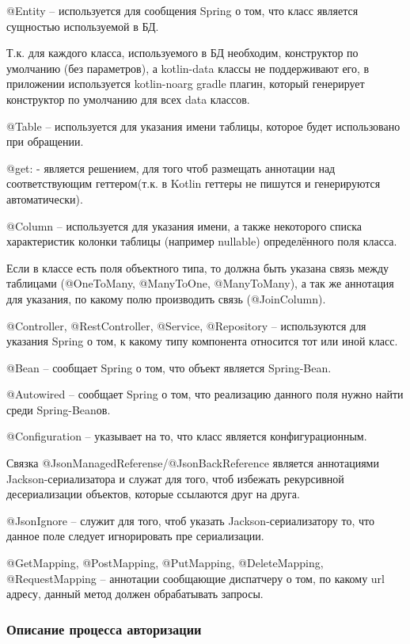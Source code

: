 @Entity – используется для сообщения Spring о том, что класс является сущностью используемой в БД.

Т.к. для каждого класса, используемого в БД необходим, конструктор по умолчанию (без параметров), а kotlin-data классы не поддерживают его, в приложении используется kotlin-noarg gradle плагин, который генерирует конструктор по умолчанию для всех data классов.

@Table – используется для указания имени таблицы, которое будет использовано при обращении.

@get: - является решением, для того чтоб размещать аннотации над соответствующим геттером(т.к. в Kotlin геттеры не пишутся и генерируются автоматически).

@Column – используется для указания имени, а также некоторого списка характеристик колонки таблицы (например nullable) определённого поля класса.

Если в классе есть поля объектного типа, то должна быть указана связь между таблицами (@OneToMany, @ManyToOne, @ManyToMany), а так же аннотация для указания, по какому полю производить связь (@JoinColumn).

@Controller, @RestController, @Service, @Repository – используются для указания Spring о том, к какому типу компонента относится тот или иной класс.

@Bean – сообщает Spring о том, что объект является Spring-Bean.

@Autowired – сообщает Spring о том, что реализацию данного поля нужно найти среди Spring-Beanов.

@Configuration – указывает на то, что класс является конфигурационным.

Связка @JsonManagedReferense/@JsonBackReference является аннотациями Jackson-сериализатора и служат для того, чтоб избежать рекурсивной десериализации объектов, которые ссылаются друг на друга.

@JsonIgnore – служит для того, чтоб указать Jackson-сериализатору то, что данное поле следует игнорировать пре сериализации.

@GetMapping, @PostMapping, @PutMapping, @DeleteMapping, @RequestMapping – аннотации сообщающие диспатчеру о том, по какому url адресу, данный метод должен обрабатывать запросы.

\subsubsection{Описание процесса авторизации}\indent

